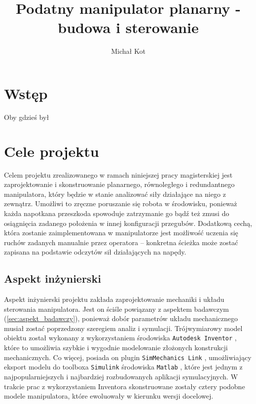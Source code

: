 \documentclass[printmode]{mgr}
\title{Podatny manipulator planarny - budowa i sterowanie}
\author{Michał Kot}
\begin{document}

\maketitle %
\tableofcontents %


\chapter{Wstęp}
Oby gdzieś był

\chapter{Cele projektu} \label{ch:cele}
Celem projektu zrealizowanego w ramach niniejszej pracy magisterskiej jest zaprojektowanie i skonstruowanie planarnego, równoległego
i redundantnego manipulatora, który będzie w stanie analizować siły działające na niego z zewnątrz. Umożliwi to 
zręczne poruszanie się robota w środowisku, ponieważ każda napotkana przeszkoda spowoduje zatrzymanie go bądź też zmusi
do osiągnięcia zadanego położenia w innej konfiguracji przegubów. Dodatkową cechą, która zostanie zaimplementowana w manipulatorze
jest możliwość uczenia się ruchów zadanych manualnie przez operatora -- konkretna ścieżka może zostać zapisana na podstawie
odczytów sił działających na napędy. 

\section{Aspekt inżynierski}
Aspekt inżynierski projektu zakłada zaprojektowanie mechaniki i układu sterowania manipulatora. Jest on ściśle powiązany
z aspektem badawczym (\ref{sec:aspekt_badawczy}), ponieważ dobór parametrów układu mechanicznego musiał zostać poprzedzony
szeregiem analiz i symulacji. Trójwymiarowy model obiektu został wykonany z wykorzystaniem środowiska \texttt{Autodesk Inventor} \cite{autodesk},
które to umożliwia szybkie i wygodnie modelowanie złożonych konstrukcji mechanicznych. Co więcej, posiada on plugin
\texttt{SimMechanics Link} \cite{simmechanics_link}, umożliwiający eksport modelu do toolboxa \texttt{Simulink} środowiska 
\texttt{Matlab} \cite{mathworks}, które jest jednym z najpopularniejszych i najbardziej rozbudowanych aplikacji symulacyjnych.
W trakcie prac z wykorzystaniem Inventora skonstruowane zostały cztery podobne modele manipulatora, które ewoluowały 
w kierunku wersji docelowej. 
\end{document}

